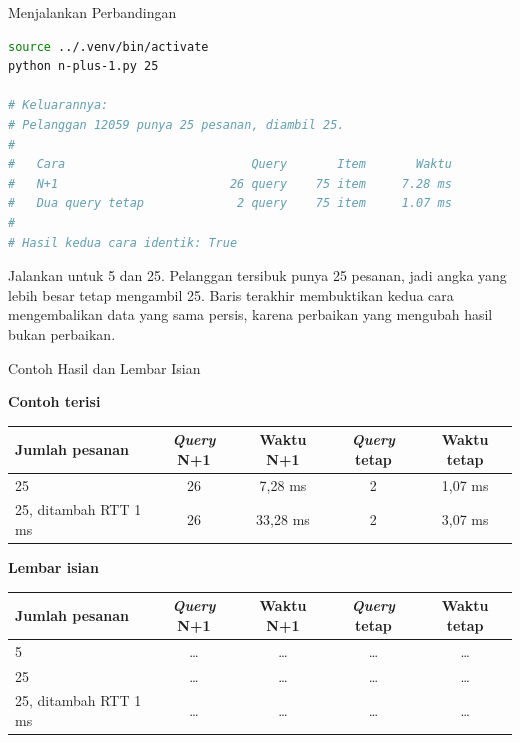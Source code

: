 \documentclass[aspectratio=169, table, 12pt]{beamer}
\begin{document}
\begin{frame}[fragile]{{\Large Menjalankan Perbandingan}}
  \vspace{2pt}
\begin{lstlisting}[language=bash]
source ../.venv/bin/activate
python n-plus-1.py 25

# Keluarannya:
# Pelanggan 12059 punya 25 pesanan, diambil 25.
#
#   Cara                          Query       Item       Waktu
#   N+1                        26 query    75 item     7.28 ms
#   Dua query tetap             2 query    75 item     1.07 ms
#
# Hasil kedua cara identik: True
\end{lstlisting}

  \vspace{2pt}
  {\footnotesize Jalankan untuk 5 dan 25. Pelanggan tersibuk punya 25
  pesanan, jadi angka yang lebih besar tetap mengambil 25. Baris terakhir membuktikan kedua cara mengembalikan data yang
  sama persis, karena perbaikan yang mengubah hasil bukan perbaikan.}
\end{frame}

\begin{frame}{{\Large Contoh Hasil dan Lembar Isian}}
  \vspace{3pt}
  \centering
  {\small \textbf{Contoh terisi}\\[3pt]
  \begin{tabularx}{\textwidth}{Xcccc}
    \hline
    \textbf{Jumlah pesanan} & \textbf{\textit{Query} N+1} & \textbf{Waktu N+1} & \textbf{\textit{Query} tetap} & \textbf{Waktu tetap} \\
    \hline
    25 & 26 & 7,28 ms & 2 & 1,07 ms \\
    \hline
    25, ditambah RTT 1 ms & 26 & 33,28 ms & 2 & 3,07 ms \\
    \hline
  \end{tabularx}}

  \vspace{6pt}
  {\small \textbf{Lembar isian}\\[3pt]
  \begin{tabularx}{\textwidth}{Xcccc}
    \hline
    \textbf{Jumlah pesanan} & \textbf{\textit{Query} N+1} & \textbf{Waktu N+1} & \textbf{\textit{Query} tetap} & \textbf{Waktu tetap} \\
    \hline
    5 & \dots & \dots & \dots & \dots \\
    \hline
    25 & \dots & \dots & \dots & \dots \\
    \hline
    25, ditambah RTT 1 ms & \dots & \dots & \dots & \dots \\
    \hline
  \end{tabularx}}
\end{frame}
\end{document}
